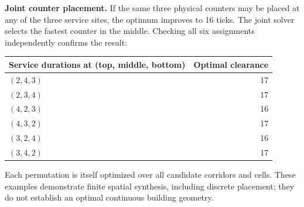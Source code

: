 \textbf{Joint counter placement.} If the same three physical counters may be placed at any of the three service sites, the optimum improves to 16 ticks. The joint solver selects the fastest counter in the middle. Checking all six assignments independently confirms the result:
\begin{center}\small
\begin{tabular}{lr}\toprule
Service durations at (top, middle, bottom)&Optimal clearance\\\midrule
$(2, 4, 3)$ & 17 \\
$(2, 3, 4)$ & 17 \\
$(4, 2, 3)$ & 16 \\
$(4, 3, 2)$ & 17 \\
$(3, 2, 4)$ & 16 \\
$(3, 4, 2)$ & 17 \\
\bottomrule\end{tabular}\end{center}
Each permutation is itself optimized over all candidate corridors and cells. These examples demonstrate finite spatial synthesis, including discrete placement; they do not establish an optimal continuous building geometry.
